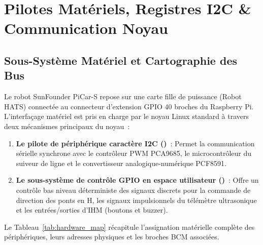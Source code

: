 \chapter{Pilotes Matériels, Registres I2C \& Communication Noyau}
\label{chap:hardware_drivers}

\section{Sous-Système Matériel et Cartographie des Bus}
Le robot SunFounder PiCar-S repose sur une carte fille de puissance (Robot HATS) connectée au connecteur d'extension GPIO 40 broches du Raspberry Pi. L'interfaçage matériel est pris en charge par le noyau Linux standard à travers deux mécanismes principaux du noyau~:
\begin{enumerate}
    \item \textbf{Le pilote de périphérique caractère I2C ()}~: Permet la communication sérielle synchrone avec le contrôleur PWM PCA9685, le microcontrôleur du suiveur de ligne et le convertisseur analogique-numérique PCF8591.
    \item \textbf{Le sous-système de contrôle GPIO en espace utilisateur ()}~: Offre un contrôle bas niveau déterministe des signaux discrets pour la commande de direction des ponts en H, les signaux impulsionnels du télémètre ultrasonique et les entrées/sorties d'IHM (boutons et buzzer).
\end{enumerate}

Le Tableau~\ref{tab:hardware_map} récapitule l'assignation matérielle complète des périphériques, leurs adresses physiques et les broches BCM associées.

